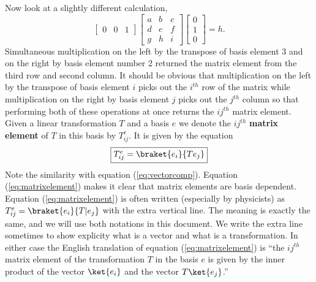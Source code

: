 Now look at a slightly different calculation,
\begin{displaymath}\left[ \begin{array}{ccc} 0&0&1 \end{array} \right] \left[ \begin{array}{ccc} a&b&c\\d&e&f\\g&h&i \end{array} \right] \left[ \begin{array}{c} 0\\1\\0 \end{array} \right] = h. \end{displaymath}
Simultaneous multiplication on the left by the transpose of basis element 3 and on the right by basis element number 2 returned the matrix element from the third row and second column.  It should be obvious that multiplication on the left by the transpose of basis element $i$ picks out the $i^{th}$ row of the matrix while multiplication on the right by basis element $j$ picks out the $j^{th}$ column so that performing both of these operations at once returns the $ij^{th}$ matrix element.  Given a linear transformation $T$ and a basis $e$ we denote the $ij^{th}$ \textbf{matrix element} of $T$ in this basis by $T^e_{ij}$.  It is given by the equation
\begin{equation}\label{eq:matrixelement} \framebox{$T^e_{ij} = \braket{e_i}{Te_j}$}\end{equation}
Note the similarity with equation (\ref{eq:vectorcomp}).  Equation (\ref{eq:matrixelement}) makes it clear that matrix elements are basis dependent.  Equation (\ref{eq:matrixelement}) is often written (especially by physicists) as $T^e_{ij} = \braket{e_i}{T|e_j}$ with the extra vertical line.  The meaning is exactly the same, and we will use both notations in this document.  We write the extra line sometimes to show explicity what is a vector and what is a transformation.  In either case the English translation of equation (\ref{eq:matrixelement}) is ``the $ij^{th}$ matrix element of the transformation $T$ in the basis $e$ is given by the inner product of the vector $\ket{e_i}$ and the vector $T\ket{e_j}$.''

